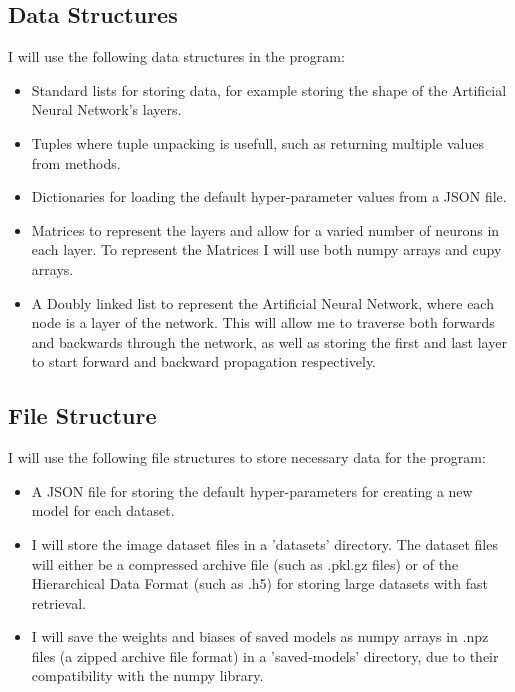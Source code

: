 \documentclass[./project-report/src/latex/project-report.tex]{subfiles}
\begin{document}
\subsection{Data Structures}

I will use the following data structures in the program:

\begin{itemize}
    \item Standard lists for storing data, for example storing the shape of the Artificial Neural Network's layers.
    \item Tuples where tuple unpacking is usefull, such as returning multiple values from methods.
    \item Dictionaries for loading the default hyper-parameter values from a JSON file.
    \item Matrices to represent the layers and allow for a varied number of neurons in each layer. To represent the Matrices I will use both numpy arrays and cupy 
          arrays.
    \item A Doubly linked list to represent the Artificial Neural Network, where each node is a layer of the network. This will allow me to traverse both forwards and 
          backwards through the network, as well as storing the first and last layer to start forward and backward propagation respectively.
\end{itemize}

\subsection{File Structure}

I will use the following file structures to store necessary data for the program:

\begin{itemize}
    \item A JSON file for storing the default hyper-parameters for creating a new model for each dataset.
    \item I will store the image dataset files in a 'datasets' directory. The dataset files will either be a compressed archive file (such as .pkl.gz files) or of the 
          Hierarchical Data Format (such as .h5) for storing large datasets with fast retrieval.
    \item I will save the weights and biases of saved models as numpy arrays in .npz files (a zipped archive file format) in a 'saved-models' directory, due to 
          their compatibility with the numpy library.
\end{itemize}
\end{document}

